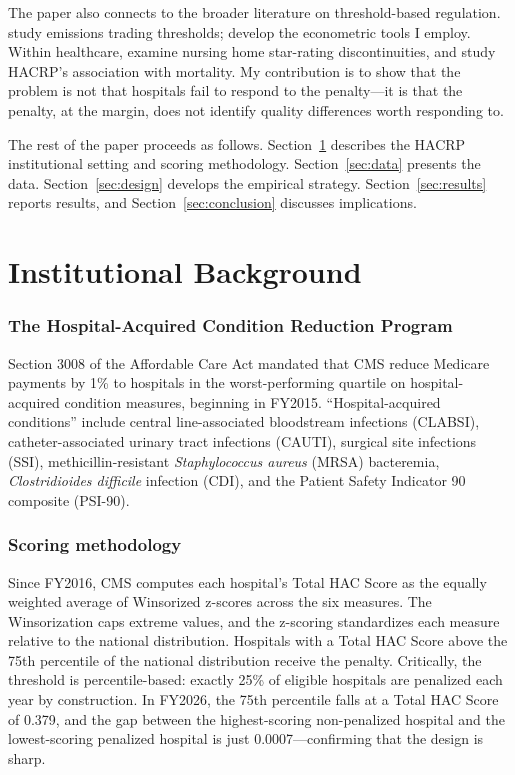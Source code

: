 \documentclass[12pt]{article}
\begin{document}
The paper also connects to the broader literature on threshold-based regulation. \citet{reguant2019boundary} study emissions trading thresholds; \citet{cattaneo2020rdrobust} develop the econometric tools I employ. Within healthcare, \citet{gupta2021impacts} examine nursing home star-rating discontinuities, and \citet{erickson2020association} study HACRP's association with mortality. My contribution is to show that the problem is not that hospitals fail to respond to the penalty---it is that the penalty, at the margin, does not identify quality differences worth responding to.

The rest of the paper proceeds as follows. Section~\ref{sec:background} describes the HACRP institutional setting and scoring methodology. Section~\ref{sec:data} presents the data. Section~\ref{sec:design} develops the empirical strategy. Section~\ref{sec:results} reports results, and Section~\ref{sec:conclusion} discusses implications.


\section{Institutional Background}\label{sec:background}

\subsubsection*{The Hospital-Acquired Condition Reduction Program} Section 3008 of the Affordable Care Act mandated that CMS reduce Medicare payments by 1\% to hospitals in the worst-performing quartile on hospital-acquired condition measures, beginning in FY2015. ``Hospital-acquired conditions'' include central line-associated bloodstream infections (CLABSI), catheter-associated urinary tract infections (CAUTI), surgical site infections (SSI), methicillin-resistant \textit{Staphylococcus aureus} (MRSA) bacteremia, \textit{Clostridioides difficile} infection (CDI), and the Patient Safety Indicator 90 composite (PSI-90).

\subsubsection*{Scoring methodology} Since FY2016, CMS computes each hospital's Total HAC Score as the equally weighted average of Winsorized z-scores across the six measures. The Winsorization caps extreme values, and the z-scoring standardizes each measure relative to the national distribution. Hospitals with a Total HAC Score above the 75th percentile of the national distribution receive the penalty. Critically, the threshold is percentile-based: exactly 25\% of eligible hospitals are penalized each year by construction. In FY2026, the 75th percentile falls at a Total HAC Score of 0.379, and the gap between the highest-scoring non-penalized hospital and the lowest-scoring penalized hospital is just 0.0007---confirming that the design is sharp.
\end{document}
